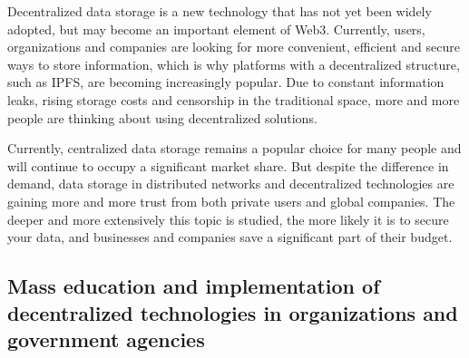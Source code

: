 \documentclass[10pt,conference,a4paper]{IEEEtran_EDM}
\begin{document}
Decentralized data storage is a new technology that has
not yet been widely adopted, but may become an important
element of Web3. Currently, users, organizations and companies are looking for more convenient, efficient and secure ways to store information, which is why platforms with a decentralized structure, such as IPFS, are becoming increasingly popular. Due to constant
information leaks, rising storage costs and censorship in
the traditional space, more and more people are thinking
about using decentralized solutions.

Currently, centralized data storage remains a popular choice for many people and will continue to occupy a significant market share.
But despite the difference in demand, data storage in distributed networks and decentralized technologies are gaining more and more trust from both private users and global companies. The deeper and more extensively this topic is studied, the more likely it is to secure your data, and businesses and companies save a significant part of their budget.

\subsection{Mass education and implementation of decentralized technologies in organizations and government agencies }
\end{document}
